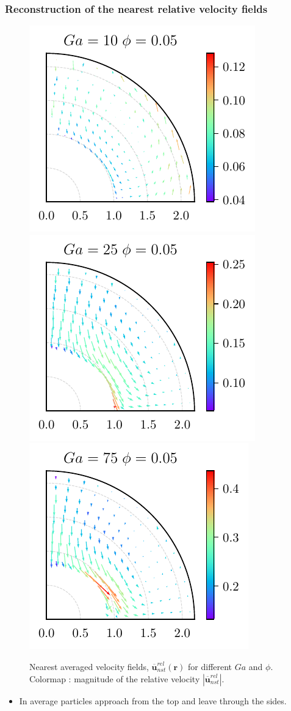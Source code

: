 \documentclass{sintefbeamer}
\newcommand{\nstrelavg}[1]{\overline{#1}_{nst}^{rel}}
\begin{document}
\begin{frame}
  \frametitle{Reconstruction of the nearest relative velocity fields}

  \begin{figure}
    
    \includegraphics[height=0.25\textwidth]{image/HOMOGENEOUS/fDrop/U_mu_r_0_1_Ga_10_PHI_0_05.pdf}
    \includegraphics[height=0.25\textwidth]{image/HOMOGENEOUS/fDrop/U_mu_r_0_1_Ga_25_PHI_0_05.pdf}
    \includegraphics[height=0.25\textwidth]{image/HOMOGENEOUS/fDrop/U_mu_r_0_1_Ga_75_PHI_0_05.pdf}
    
    \caption{Nearest averaged velocity fields, $\nstrelavg{\textbf{u}} (\textbf{r})$ for different $Ga$ and $\phi$. 
    Colormap : magnitude of the relative velocity $|\nstrelavg{\textbf{u}}|$. }
  \end{figure}

\begin{itemize}
  \item In average particles approach from the top and leave through the sides. 
\end{itemize}
\end{frame}
\end{document}
